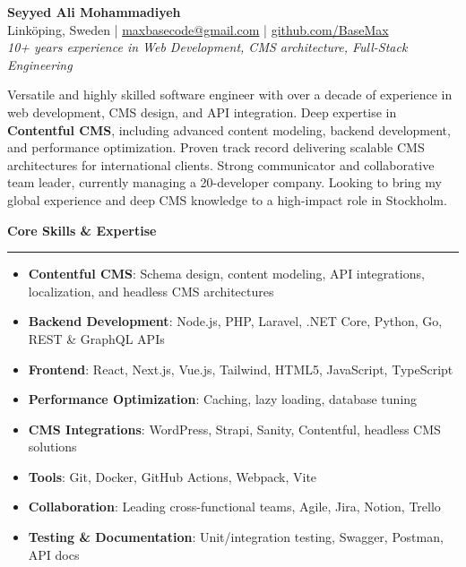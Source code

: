 \documentclass[a4paper,10pt]{article}
\newcommand{\sectiontitle}[1]{\vspace{6pt}\noindent\textbf{\large #1}\vspace{3pt}\hrule\vspace{6pt}}
\begin{document}
	
	\begin{center}
		{\LARGE \textbf{Seyyed Ali Mohammadiyeh}}\\
		\vspace{2pt}
		Linköping, Sweden \quad | \quad \href{mailto:maxbasecode@gmail.com}{maxbasecode@gmail.com} \quad | \quad
		\href{https://github.com/BaseMax}{github.com/BaseMax} \\
		\vspace{2pt}
		\textit{10+ years experience in Web Development, CMS architecture, Full-Stack Engineering}
	\end{center}
	
	Versatile and highly skilled software engineer with over a decade of experience in web development, CMS design, and API integration. Deep expertise in \textbf{Contentful CMS}, including advanced content modeling, backend development, and performance optimization. Proven track record delivering scalable CMS architectures for international clients. Strong communicator and collaborative team leader, currently managing a 20-developer company. Looking to bring my global experience and deep CMS knowledge to a high-impact role in Stockholm.
	
	\sectiontitle{Core Skills \& Expertise}
	\begin{itemize}
		\item \textbf{Contentful CMS}: Schema design, content modeling, API integrations, localization, and headless CMS architectures
		\item \textbf{Backend Development}: Node.js, PHP, Laravel, .NET Core, Python, Go, REST \& GraphQL APIs
		\item \textbf{Frontend}: React, Next.js, Vue.js, Tailwind, HTML5, JavaScript, TypeScript
		\item \textbf{Performance Optimization}: Caching, lazy loading, database tuning
		\item \textbf{CMS Integrations}: WordPress, Strapi, Sanity, Contentful, headless CMS solutions
		\item \textbf{Tools}: Git, Docker, GitHub Actions, Webpack, Vite
		\item \textbf{Collaboration}: Leading cross-functional teams, Agile, Jira, Notion, Trello
		\item \textbf{Testing \& Documentation}: Unit/integration testing, Swagger, Postman, API docs
	\end{itemize}
	
\end{document}
